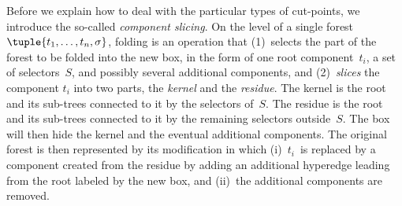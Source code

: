 {
Before we explain how to deal with the particular types of cut-points, we introduce the so-called \emph{component slicing}.
%
On the level of a single forest $\tuple{t_1,\ldots,t_n,\sigma}$, 
folding is an operation that
(1)~selects the part of the forest to be folded into the new box, in the form of 
one root component~$t_i$, a set of selectors~$S$, and possibly several
additional components, and 
(2)~\emph{slices} the component $t_i$ into two parts, the \emph{kernel} and the
\emph{residue}.
The kernel is the root and its sub-trees connected to it by the selectors of~$S$. 
The residue is the root and its sub-trees connected to it by the remaining
selectors outside~$S$.
The box will then hide the kernel and the eventual additional components.
The original forest is then represented by its modification in which (i)~$t_i$~is replaced by a component created from the residue
by adding an additional hyperedge leading from the root labeled by the new box, and (ii)~the additional components are removed.


}
